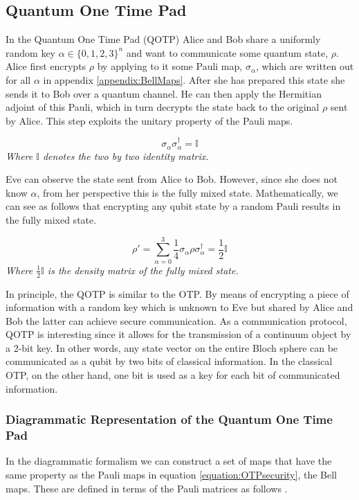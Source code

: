 \documentclass[]{article}
\begin{document}
\subsection{Quantum One Time Pad}
\label{QOTP}
In the Quantum One Time Pad (QOTP) Alice and Bob share a uniformly random key $ \alpha \in \{0,1,2,3\}^n$ and want to communicate some quantum state, $\rho$. Alice first encrypts $\rho$ by applying to it some Pauli map, $\sigma_\alpha$, which are written out for all $\alpha$ in appendix \ref{appendix:BellMaps}. After she has prepared this state she sends it to Bob over a quantum channel. He can then apply the Hermitian adjoint of this Pauli, which in turn decrypts the state back to the original $\rho$ sent by Alice. This step exploits the unitary property of the Pauli maps.

\begin{equation}
\sigma_\alpha\sigma_\alpha^\dagger = \mathbb{I}
\end{equation}
\textit{Where $\mathbb{I}$ denotes the two by two identity matrix.}
 
Eve can observe the state sent from Alice to Bob. However, since she does not know $\alpha$, from her perspective this is the fully mixed state. Mathematically, we can see as follows that encrypting any qubit state by a random Pauli results in the fully mixed state.

\begin{equation}
	\label{equation:OTPsecurity}
	\rho' = \sum\limits_{\alpha = 0}^3 \frac{1}{4} \sigma_\alpha \rho \sigma_\alpha^\dagger = \frac{1}{2}\mathbb{I}
\end{equation}
\textit{Where $\frac{1}{2}\mathbb{I}$ is the density matrix of the fully mixed state.}

In principle, the QOTP is similar to the OTP. By means of encrypting a piece of information with a random key which is unknown to Eve but shared by Alice and Bob the latter can achieve secure communication. As a communication protocol, QOTP is interesting since it allows for the transmission of a continuum object by a 2-bit key. In other words, any state vector on the entire Bloch sphere can be communicated as a qubit by two bits of classical information. In the classical OTP, on the other hand, one bit is used as a key for each bit of communicated information.

\subsubsection{Diagrammatic Representation of the Quantum One Time Pad}
\label{DiagramRepresentationQOTP}
In the diagrammatic formalism we can construct a set of maps that have the same property as the Pauli maps in equation \ref{equation:OTPsecurity}, the Bell maps. These are defined in terms of the Pauli matrices as follows \cite{Coecke2017}.
\end{document}
